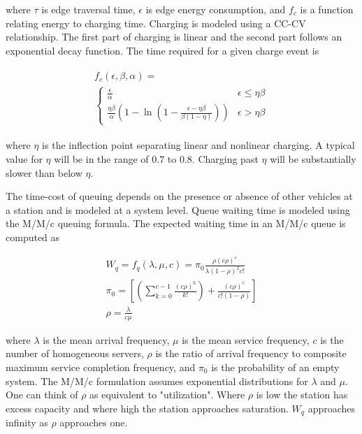 where $\tau$ is edge traversal time, $\epsilon$ is edge energy consumption, and $f_c$ is a function relating energy to charging time. Charging is modeled using a CC-CV relationship. The first part of charging is linear and the second part follows an exponential decay function. The time required for a given charge event is

\begin{gather}
	\begin{gathered}
	f_{c}(\epsilon, \beta, \alpha) = \\\begin{cases}
		\frac{\epsilon}{\alpha} & \epsilon \leq \eta\beta \\
		\frac{\eta\beta}{\alpha}\left(1-\ln{\left(1-\frac{\epsilon - \eta\beta}{\beta(1-\eta)}\right)}\right) &  \epsilon > \eta\beta
	\end{cases}
	\end{gathered}
\end{gather}

where $\eta$ is the inflection point separating linear and nonlinear charging. A typical value for $\eta$ will be in the range of 0.7 to 0.8. Charging past $\eta$ will be substantially slower than below $\eta$.

The time-cost of queuing depends on the presence or absence of other vehicles at a station and is modeled at a system level. Queue waiting time is modeled using the M/M/c queuing formula. The expected waiting time in an M/M/c queue is computed as

\begin{gather}
	W_q = f_{q}(\lambda, \mu, c) = \pi_0\frac{\rho(c\rho)^c}{\lambda(1-\rho)^2c!}\label{eq:w_q}\\
	\pi_0=\left[\left(\sum_{k = 0}^{c - 1}\frac{(c\rho)^k}{k!}\right) + \frac{(c\rho)^c}{c!(1 - \rho)}\right]\\
	\rho = \frac{\lambda}{c\mu}
\end{gather}

where $\lambda$ is the mean arrival frequency, $\mu$ is the mean service frequency, $c$ is the number of homogeneous servers, $\rho$ is the ratio of arrival frequency to composite maximum service completion frequency, and $\pi_0$ is the probability of an empty system. The M/M/c formulation assumes exponential distributions for $\lambda$ and $\mu$. One can think of $\rho$ as equivalent to "utilization". Where $\rho$ is low the station has excess capacity and where high the station approaches saturation. $W_q$ approaches infinity as $\rho$ approaches one.

